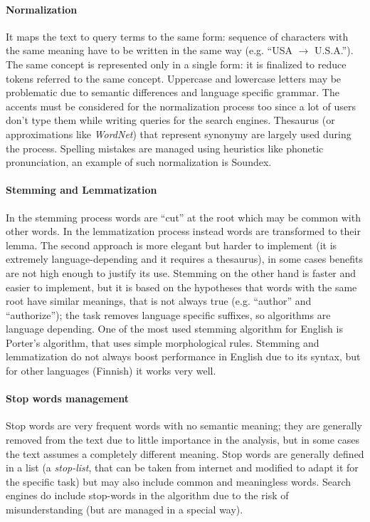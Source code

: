 \documentclass[11pt, a4page]{article}
\begin{document}
\paragraph{Normalization}
It maps the text to query terms to the same form: sequence of characters with the same meaning have to be written in the same way (e.g. ``USA $\rightarrow$ U.S.A.'').
The same concept is represented only in a single form: it is finalized to reduce tokens referred to the same concept.
Uppercase and lowercase letters may be problematic due to semantic differences and language specific grammar. 
The accents must be considered for the normalization process too since a lot of users don't type them while writing queries for the search engines.
Thesaurus (or approximations like \textit{WordNet}) that represent synonymy are largely used during the process.
Spelling mistakes are managed using heuristics like phonetic pronunciation, an example of such normalization is Soundex.

\paragraph{Stemming and Lemmatization}
In the stemming process words are ``cut'' at the root which may be common with other words.
In the lemmatization process instead words are transformed to their lemma.
The second approach is more elegant but harder to implement (it is extremely language-depending and it requires a thesaurus), in some cases benefits are not high enough to justify its use.
Stemming on the other hand is faster and easier to implement, but it is based on the hypotheses that words with the same root have similar meanings, that is not always true (e.g. ``author'' and ``authorize''); the task removes language specific suffixes, so algorithms are language depending.
One of the most used stemming algorithm for English is Porter's algorithm, that uses simple morphological rules.
Stemming and lemmatization do not always boost performance in English due to its syntax, but for other languages (Finnish) it works very well.

\paragraph{Stop words management}
Stop words are very frequent words with no semantic meaning; they are generally removed from the text due to little importance in the analysis, but in some cases the text assumes a completely different meaning.
Stop words are generally defined in a list (a \textit{stop-list}, that can be taken from internet and modified to adapt it for the specific task) but may also include common and meaningless words.
Search engines do include stop-words in the algorithm due to the risk of misunderstanding (but are managed in a special way).
\newline
\end{document}
